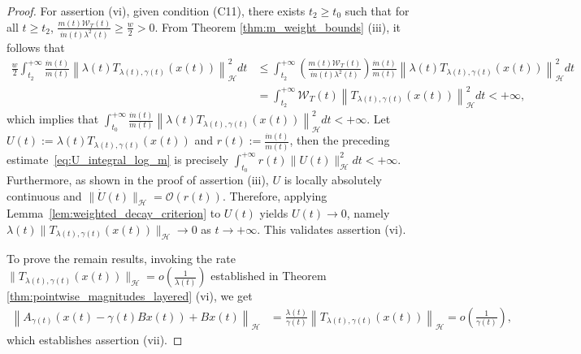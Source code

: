 \documentclass[10pt,a4paper]{amsart}
\begin{document}
\begin{proof}
For assertion (vi), given condition (C11), there exists $t_2 \ge t_0$ such that for all $t \ge t_2$, $\frac{m(t) \mathcal{W}_T(t)}{\dot{m}(t) \lambda^2(t)} \ge \frac{w}{2} > 0$. 
From Theorem \ref{thm:m_weight_bounds} (iii), it follows that
\begin{align}
\frac{w}{2} \int_{t_2}^{+\infty} \frac{\dot{m}(t)}{m(t)} \left\| \lambda(t) T_{\lambda(t), \gamma(t)}(x(t)) \right\|_{\mathcal{H}}^2 dt &\le \int_{t_2}^{+\infty} \left( \frac{m(t) \mathcal{W}_T(t)}{\dot{m}(t) \lambda^2(t)} \right) \frac{\dot{m}(t)}{m(t)} \left\| \lambda(t) T_{\lambda(t), \gamma(t)}(x(t)) \right\|_{\mathcal{H}}^2 dt \nonumber \\
&= \int_{t_2}^{+\infty} \mathcal{W}_T(t) \left\| T_{\lambda(t), \gamma(t)}(x(t)) \right\|_{\mathcal{H}}^2 dt < +\infty, 
\label{eq:U_integral_log_m}
\end{align}
which implies that $\int_{t_0}^{+\infty} \frac{\dot{m}(t)}{m(t)} \left\| \lambda(t) T_{\lambda(t), \gamma(t)}(x(t)) \right\|_{\mathcal{H}}^2 dt < +\infty$. Let $U(t):=\lambda(t)T_{\lambda(t),\gamma(t)}(x(t))$ and $r(t):=\frac{\dot m(t)}{m(t)}$, then the preceding estimate~\eqref{eq:U_integral_log_m} is precisely $\int_{t_0}^{+\infty}r(t)\|U(t)\|_{\mathcal{H}}^2dt<+\infty$. Furthermore, as shown in the proof of assertion {\rm (iii)}, $U$ is locally absolutely continuous and $\|\dot U(t)\|_{\mathcal{H}}=\mathcal{O}(r(t))$. Therefore, applying Lemma~\ref{lem:weighted_decay_criterion} to $U(t)$ yields $U(t)\to0$, namely $\lambda(t)\|T_{\lambda(t),\gamma(t)}(x(t))\|_{\mathcal{H}}\to0$ as $t \to +\infty$. This validates assertion (vi).

To prove the remain results, invoking the rate $\|T_{\lambda(t), \gamma(t)}(x(t))\|_{\mathcal{H}} = o(\frac{1}{\lambda(t)})$ established in Theorem \ref{thm:pointwise_magnitudes_layered} (vi), we get
\begin{align*}
\left\| A_{\gamma(t)} \left( x(t) - \gamma(t) Bx(t) \right) + Bx(t) \right\|_{\mathcal{H}} &= \frac{\lambda(t)}{\gamma(t)} \left\| T_{\lambda(t), \gamma(t)}(x(t)) \right\|_{\mathcal{H}}  = o\left( \frac{1}{\gamma(t)} \right),
\label{eq:operator_sum_magnitude_result}
\end{align*}
which establishes assertion (vii). 


\end{proof}
\end{document}

